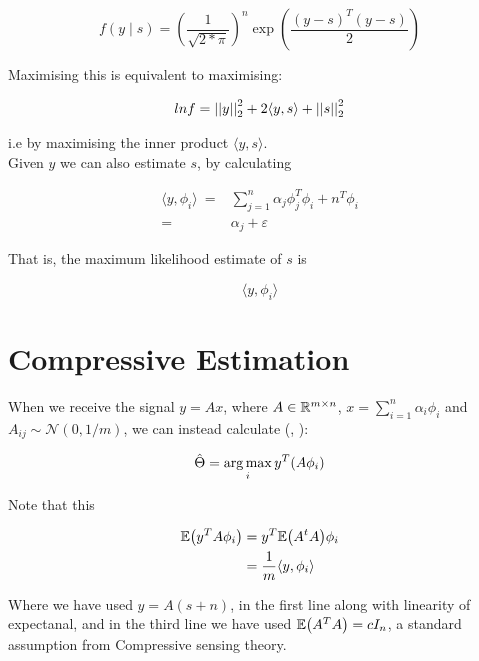 \documentclass{article}
\begin{document}
\begin{equation}
f\left(y \mid s\right) = \left(\frac{1}{\sqrt{2*\pi}} \right)^n \exp{\left( \frac{\left(y-s\right)^T\left(y-s\right)}{2} \right)}
\end{equation}

Maximising this is equivalent to maximising:

\begin{equation}
ln f = \left|\left|y\right|\right|_2^2 + 2\langle y, s\rangle + \left|\left|s\right|\right|_2^2
\end{equation}

i.e by maximising the inner product \(\langle y, s\rangle\).
\\
Given \(y\) we can also estimate \(s\), by calculating 

\begin{align}
\langle y, \phi_i\rangle\ =& \sum_{j=1}^n \alpha_j \phi_j^T\phi_i + n^T\phi_i \\
=& \alpha_j + \varepsilon
\end{align}

That is, the maximum likelihood estimate of \(s\) is 

\begin{equation}
\langle y, \phi_i \rangle
\end{equation}

\section{Compressive Estimation} \label{sec:estimation}

When we receive the signal \(y = Ax\), where \(A \in {\mathbb{R}}^{m \times n} \), \(x = \sum_{i=1}^n \alpha_i \phi_i\) and \(A_{ij} \sim \mathcal{N}\left(0,1/m\right)\), we can instead calculate (\cite{davenport2007smashed}, \cite{braun2009signal}):

\begin{equation}
\hat{\Theta} = \operatorname*{arg\,max}_{i} y^T(A\phi_i)
\label{smashed_filter}
\end{equation}

Note that this

\begin{align}
{\mathbb{E}}{\left(y^TA\phi_i \right)} &= y^T{\mathbb{E}}{\left(A^tA\right)}\phi_i \\
&= \frac{1}{m} \langle y, \phi_i \rangle
\end{align}

Where we have used \(y = A(s+n)\), in the first line along with linearity of expectanal, and in the third line we have used \({\mathbb{E}}{\left(A^TA\right)} = cI_n\), a standard assumption from Compressive sensing theory.
\end{document}

